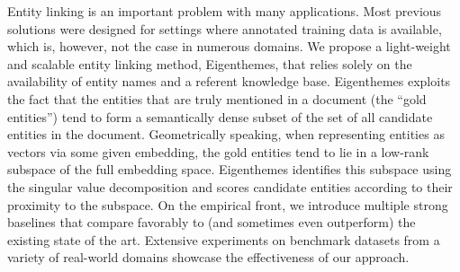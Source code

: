 Entity linking is an important problem with many applications. Most previous solutions were designed for settings where annotated training data is available, which is, however, not the case in numerous domains. We propose a light-weight and scalable entity linking method, Eigenthemes, that relies solely on the availability of entity names and a referent knowledge base. Eigenthemes exploits the fact that the entities that are truly mentioned in a document (the ``gold entities'') tend to form a semantically dense subset of the set of all candidate entities in the document. Geometrically speaking, when representing entities as vectors via some given embedding, the gold entities tend to lie in a low-rank subspace of the full embedding space. Eigenthemes identifies this subspace using the singular value decomposition and scores candidate entities according to their proximity to the subspace. On the empirical front, we introduce multiple strong baselines that compare favorably to (and sometimes even outperform) the existing state of the art. Extensive experiments on benchmark datasets from a variety of real-world domains showcase the effectiveness of our approach.
